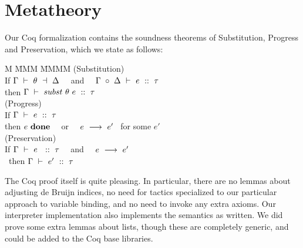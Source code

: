 
\section{Metatheory}
Our Coq formalization contains the soundness theorems of Substitution, Progress and Preservation, which we state as follows:

\begin{tabbing}
M \= MMM  \= MMMM \kill
(Substitution)\\
\> If   \> $\TypeS{\Gamma}{\theta}{\Delta}$  
   ~~and~~ $\Gamma ~\circ~ \Delta ~\vdash~ e ~::~ \tau$    \\
\> then \> $\Gamma ~\vdash~ subst~ \theta~ e ~::~ \tau$
\\[0.5ex]
(Progress)\\
\> If   \> $\Gamma ~\vdash~ e ~::~ \tau$       \\
\> then \> $e~ \textbf{done}$  ~~or~~  $e ~\longrightarrow~ e'$~ for some $e'$
\\[0.5ex]
(Preservation)\\
\> If    \> $\Gamma ~\vdash~ e~ ~::~ \tau$ ~~and~~ $e ~\longrightarrow~ e'$   \\
\> ~then \> $\Gamma ~\vdash~ e' ~::~ \tau$
\end{tabbing}
The Coq proof itself is quite pleasing. In particular, there are no lemmas about adjusting de Bruijn indices, no need for tactics specialized to our particular approach to variable binding, and no need to invoke any extra axioms. Our interpreter implementation also implements the semantics as written. We did prove some extra lemmas about lists, though these are completely generic, and could be added to the Coq base libraries.



